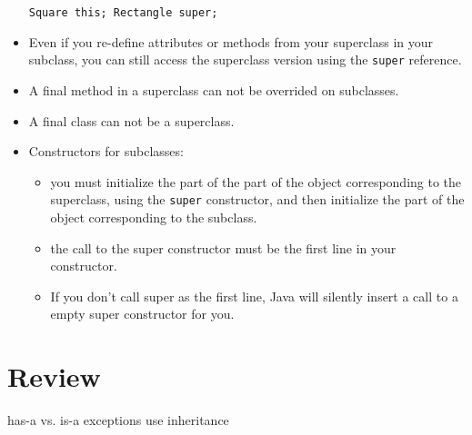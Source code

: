 \documentclass[a4paper, 9pt]{extarticle}
\begin{document}
\begin{itemize}
    \verb+Square this; Rectangle super;+

  \item Even if you re-define attributes or methods from your superclass in
    your subclass, you can still access the superclass version using the
    \verb+super+ reference.

  \item A final method in a superclass can not be overrided on subclasses.

  \item A final class can not be a superclass.

  \item Constructors for subclasses:

    \begin{itemize}

      \item you must initialize the part of the part of the object
        corresponding to the superclass, using the \verb+super+ constructor,
        and then initialize the part of the object corresponding to the
        subclass.

      \item the call to the super constructor must be the first line in your
        constructor.

      \item If you don't call super as the first line, Java will silently
        insert a call to a empty super constructor for you.

    \end{itemize}

\end{itemize}





















\section{Review}

\begin{blackboard}
  has-a vs. is-a
  exceptions use inheritance
\end{blackboard}
\end{document}
